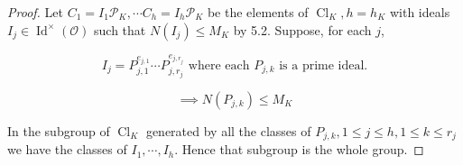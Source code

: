 \documentclass[openany]{amsbook}
\numberwithin{section}{chapter}
\theoremstyle{definition}
\begin{document}
\begin{proof}
    Let \(C_1 = I_1 \mathcal{P}_K, \cdots C_h = I_h \mathcal{P}_K\) be the elements of \(\operatorname{Cl}_K, h = h_K\) with ideals \(I_j \in \operatorname{Id}^\times (\mathcal{O})\) such that \(N(I_j) \leq M_K\) by 5.2. Suppose, for each \(j\),

    \[
        I_j = P_{j,1}^{e_{j,1}} \cdots P_{j, r_j}^{e_{j, r_j}}\text{ where each \(P_{j,k}\) is a prime ideal.} 
    \]

    \[
        \implies N(P_{j,k}) \leq M_K
    \]

    In the subgroup of \(\operatorname{Cl}_K\) generated by all the classes of \(P_{j,k}, 1 \leq j \leq h, 1 \leq k \leq r_j\) we have the classes of \(I_1, \cdots, I_h\). Hence that subgroup is the whole group. 

\end{proof}
\end{document}

